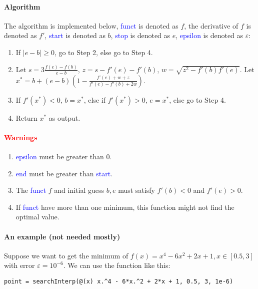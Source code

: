 \documentclass{article}
\begin{document}
\paragraph{Algorithm}
The algorithm is implemented below, \textcolor{blue}{funct} is denoted as $f$, the derivative of $f$ is denoted as $f'$, \textcolor{blue}{start} is denoted as $b$, \textcolor{blue}{stop} is denoted as $e$, \textcolor{blue}{epsilon} is denoted as $\varepsilon$:
\begin{enumerate}
    \item If $|e - b| \geqslant 0$, go to Step 2, else go to Step 4.
    \item Let $s = 3 \frac{f(e) - f(b)}{e - b}$, $z = s - f'(e) - f'(b)$, $w = \sqrt{z^2 - f'(b) f'(e)}$. Let $x^* = b + (e - b)(1 - \frac{f'(e) + w + z}{f'(e) - f'(b) + 2w})$.
    \item If $f'(x^*) < 0$, $b = x^*$, else if $f'(x^*) > 0$, $e = x^*$, else go to Step 4.
    \item Return $x^*$ as output.
\end{enumerate}

\paragraph{\textcolor{red}{Warnings}}
\begin{enumerate}
    \item \textcolor{blue}{epsilon} must be greater than $0$. 
    \item \textcolor{blue}{end} must be greater than \textcolor{blue}{start}.
    \item The \textcolor{blue}{funct} $f$ and initial guess $b, e$ must satisfy $f'(b) < 0$ and $f'(e) > 0$.
    \item If \textcolor{blue}{funct} have more than one minimum, this function might not find the optimal value.
\end{enumerate}

\paragraph{An example (not needed mostly)}
Suppose we want to get the minimum of $f(x) = x^4 - 6x^2 + 2x + 1, x \in [0.5, 3]$ with error $\varepsilon = 10^{-6}$. We can use the function like this:
\begin{verbatim}
point = searchInterp(@(x) x.^4 - 6*x.^2 + 2*x + 1, 0.5, 3, 1e-6)
\end{verbatim}
\end{document}
